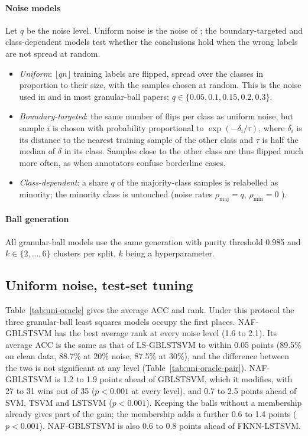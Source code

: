 \documentclass[preprint,12pt]{elsarticle}
\newcommand{\NAF}{NAF-GBLSTSVM}
\begin{document}


\paragraph{Noise models} Let $q$ be the noise level. Uniform noise is the noise of \cite{tanveer2024gblstsvm}; the boundary-targeted and class-dependent models test whether the conclusions hold when the wrong labels are not spread at random.
\begin{itemize}
\item \emph{Uniform}: $\lfloor qn\rfloor$ training labels are flipped, spread over the classes in proportion to their size, with the samples chosen at random. This is the noise used in \cite{tanveer2024gblstsvm} and in most granular-ball papers; $q\in\{0.05,0.1,0.15,0.2,0.3\}$.
\item \emph{Boundary-targeted}: the same number of flips per class as uniform noise, but sample $i$ is chosen with probability proportional to $\exp(-\delta_i/\tau)$, where $\delta_i$ is its distance to the nearest training sample of the other class and $\tau$ is half the median of $\delta$ in its class. Samples close to the other class are thus flipped much more often, as when annotators confuse borderline cases.
\item \emph{Class-dependent}: a share $q$ of the majority-class samples is relabelled as minority; the minority class is untouched (noise rates $\rho_{\text{maj}}=q$, $\rho_{\text{min}}=0$ \cite{natarajan2013}).
\end{itemize}

\paragraph{Ball generation} All granular-ball models use the same generation with purity threshold 0.985 and $k\in\{2,\dots,6\}$ clusters per split, $k$ being a hyperparameter.

\subsection{Uniform noise, test-set tuning}

Table~\ref{tab:uni-oracle} gives the average ACC and rank. Under this protocol the three granular-ball least squares models occupy the first places. \NAF{} has the best average rank at every noise level (1.6 to 2.1). Its average ACC is the same as that of LS-GBLSTSVM to within 0.05 points (89.5\% on clean data, 88.7\% at 20\% noise, 87.5\% at 30\%), and the difference between the two is not significant at any level (Table~\ref{tab:uni-oracle-pair}). \NAF{} is 1.2 to 1.9 points ahead of GBLSTSVM, which it modifies, with 27 to 31 wins out of 35 ($p<0.001$ at every level), and 0.7 to 2.5 points ahead of SVM, TSVM and LSTSVM ($p<0.001$). Keeping the balls without a membership already gives part of the gain; the membership adds a further 0.6 to 1.4 points ($p<0.001$). \NAF{} is also 0.6 to 0.8 points ahead of FKNN-LSTSVM.
\end{document}
